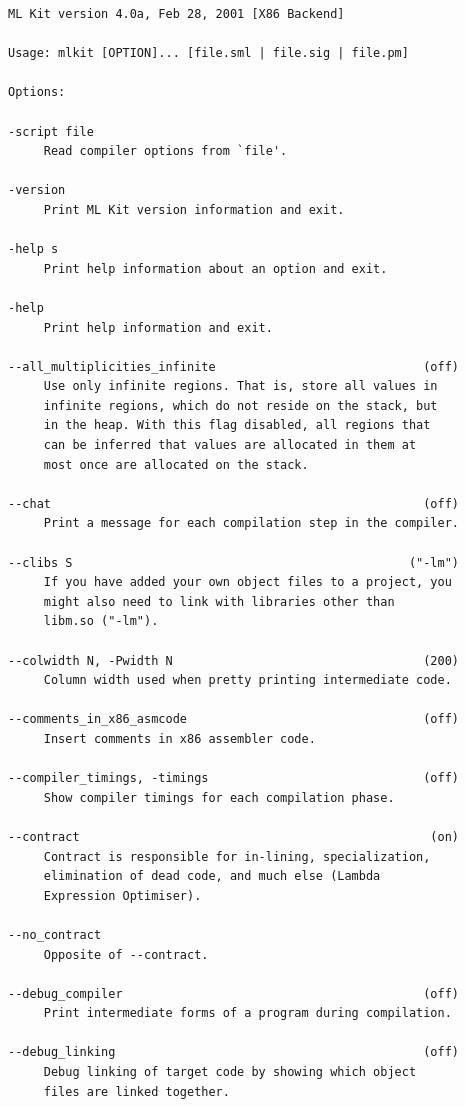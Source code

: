 \documentclass[12pt]{book}
\begin{document}
\begin{verbatim}
ML Kit version 4.0a, Feb 28, 2001 [X86 Backend]

Usage: mlkit [OPTION]... [file.sml | file.sig | file.pm]

Options:

-script file
     Read compiler options from `file'.

-version
     Print ML Kit version information and exit.

-help s
     Print help information about an option and exit.

-help
     Print help information and exit.

--all_multiplicities_infinite                             (off)
     Use only infinite regions. That is, store all values in
     infinite regions, which do not reside on the stack, but
     in the heap. With this flag disabled, all regions that
     can be inferred that values are allocated in them at
     most once are allocated on the stack.

--chat                                                    (off)
     Print a message for each compilation step in the compiler.

--clibs S                                               ("-lm")
     If you have added your own object files to a project, you
     might also need to link with libraries other than
     libm.so ("-lm").

--colwidth N, -Pwidth N                                   (200)
     Column width used when pretty printing intermediate code.

--comments_in_x86_asmcode                                 (off)
     Insert comments in x86 assembler code.

--compiler_timings, -timings                              (off)
     Show compiler timings for each compilation phase.

--contract                                                 (on)
     Contract is responsible for in-lining, specialization,
     elimination of dead code, and much else (Lambda
     Expression Optimiser).

--no_contract
     Opposite of --contract.

--debug_compiler                                          (off)
     Print intermediate forms of a program during compilation.

--debug_linking                                           (off)
     Debug linking of target code by showing which object
     files are linked together.


\end{verbatim}
\end{document}
